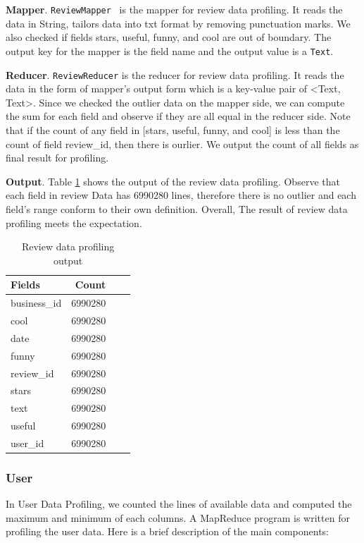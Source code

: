 \documentclass{stylefiles/capstone}
\begin{document}
\textbf{Mapper}.
\texttt{ReviewMapper} ~is the mapper for review data profiling. It reads the data in String, tailors data into txt format by removing punctuation marks. We also checked if fields stars, useful, funny, and cool are out of boundary. The output key for the mapper is the field name and the output value is a \texttt{Text}. 

\textbf{Reducer}.
\texttt{ReviewReducer} is the reducer for review data profiling. It reads the data in the form of mapper's output form which is a key-value pair of <Text, Text>. Since we checked the outlier data on the mapper side, we can compute the sum for each field and observe if they are all equal in the reducer side. Note that if the count of any field in [stars, useful, funny, and cool] is less than the count of field review\_id, then there is ourlier. We output the count of all fields as final result for profiling.

\textbf{Output}.
Table \ref{review_profile_table} shows the output of the review data profiling. Observe that each field in review Data has 6990280 lines, therefore there is no outlier and each field's range conform to their own definition. Overall, The result of review data profiling meets the expectation.

\begin{table}[h!]
\centering
\begin{tabular}{l r r r} 
 \hline
 Fields &  Count \\ [0.5ex] 
 \hline
business\_id    &      6990280 \\
cool  &  6990280\\
date  &  6990280\\
funny    &       6990280\\
review\_id   &    6990280\\
stars  &  6990280\\
text  &  6990280\\
useful  &  6990280\\
user\_id      &    6990280\\
 [1ex] 
 \hline
\end{tabular}
\caption{Review data profiling output}
\label{review_profile_table}
\end{table}

\subsubsection{\textbf{User}}

In User Data Profiling, we counted the lines of available data and computed the maximum and minimum of each columns. A MapReduce program is written for profiling the user data. Here is a brief description of the main components:
\end{document}

